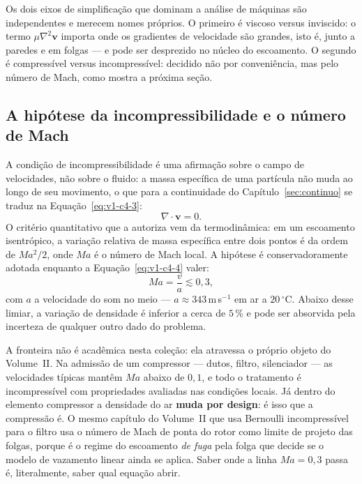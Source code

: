 \documentclass[12pt,a4paper]{article}
\numberwithin{equation}{section}
\numberwithin{table}{section}
\numberwithin{figure}{section}
\begin{document}
Os dois eixos de simplificação que dominam a análise de máquinas são
independentes e merecem nomes próprios. O primeiro é viscoso versus
inviscido: o termo $\mu\nabla^2\mathbf{v}$ importa onde os gradientes de
velocidade são grandes, isto é, junto a paredes e em folgas --- e pode ser
desprezido no núcleo do escoamento. O segundo é compressível versus
incompressível: decidido não por conveniência, mas pelo número de Mach, como
mostra a próxima seção.

\subsection{A hipótese da incompressibilidade e o número de
Mach}\label{sub:v1-c4-incompressivel}

A condição de incompressibilidade é uma afirmação sobre o campo de velocidades,
não sobre o fluido: a massa específica de uma partícula não muda ao longo de
seu movimento, o que para a continuidade do
Capítulo~\ref{sec:continuo} se traduz na Equação~\eqref{eq:v1-c4-3}:
\begin{equation}\label{eq:v1-c4-3}
\nabla\cdot\mathbf{v} = 0 .
\end{equation}
O critério quantitativo que a autoriza vem da termodinâmica: em um escoamento
isentrópico, a variação relativa de massa específica entre dois pontos é da
ordem de $Ma^2/2$, onde $Ma$ é o número de Mach local. A hipótese é
conservadoramente adotada enquanto a Equação~\eqref{eq:v1-c4-4} valer:
\begin{equation}\label{eq:v1-c4-4}
Ma = \frac{v}{a} \lesssim 0{,}3 ,
\end{equation}
com $a$ a velocidade do som no meio --- $a \approx 343\,$m\,s$^{-1}$ em ar a
$20\,^{\circ}$C. Abaixo desse limiar, a variação de densidade é inferior a
cerca de $5\,\%$ e pode ser absorvida pela incerteza de qualquer outro dado do
problema.

A fronteira não é acadêmica nesta coleção: ela atravessa o próprio objeto do
Volume~II. Na admissão de um compressor --- dutos, filtro, silenciador --- as
velocidades típicas mantêm $Ma$ abaixo de $0{,}1$, e todo o tratamento é
incompressível com propriedades avaliadas nas condições locais. Já dentro do
elemento compressor a densidade do ar \textbf{muda por design}: é isso que a
compressão é. O mesmo capítulo do Volume~II que usa Bernoulli incompressível
para o filtro usa o número de Mach de ponta do rotor como limite de projeto
das folgas, porque é o regime do escoamento \emph{de fuga} pela folga que
decide se o modelo de vazamento linear ainda se aplica. Saber onde a linha
$Ma = 0{,}3$ passa é, literalmente, saber qual equação abrir.
\end{document}
